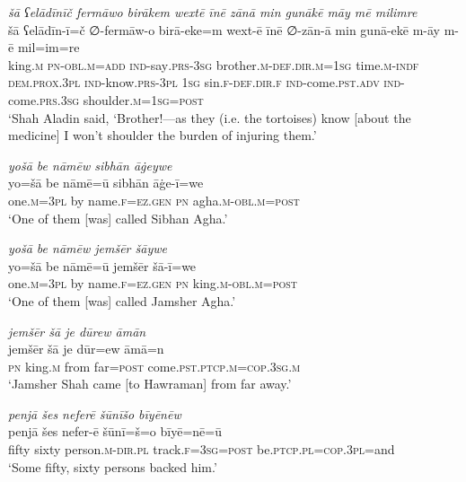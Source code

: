 \ea \label{DG.67}
\textit{šā ʕelādīnīč fermāwo birākem wextē īnē zānā min gunākē māy mē milimre} \\ 
\gll šā ʕelādīn-ī=č ∅-fermāw-o birā-eke=m wext-ē īnē ∅-zān-ā min gunā-ekē m-āy m-ē mil=im=re \\ 
 king\textsc{.m} \textsc{pn}\textsc{-obl}\textsc{.m}\textsc{=add} \textsc{ind-}say\textsc{.prs}\textsc{-3sg} brother\textsc{.m}\textsc{-def}\textsc{.dir}\textsc{.m}\textsc{=1sg} time\textsc{.m}\textsc{-indf} \textsc{dem.prox}\textsc{.3pl} \textsc{ind-}know\textsc{.prs}\textsc{-3pl} \textsc{1sg} sin\textsc{\textsc{.f}}\textsc{-def}\textsc{.dir}\textsc{\textsc{.f}} \textsc{ind-}come\textsc{.pst}\textsc{.adv} \textsc{ind-}come\textsc{.prs}\textsc{.3sg} shoulder\textsc{.m}\textsc{=1sg}\textsc{=\textsc{post}} \\ 
\glt `Shah Aladin said, ‘Brother!—as they (i.e. the tortoises) know [about the medicine] I won’t shoulder the burden of injuring them.'
\z 
 
\ea \label{DP.2}
\textit{yošā be nāmēw sibhān āġeywe} \\ 
\gll yo=šā be nāmē=ū sibhān āġe-ī=we \\ 
 one\textsc{.m}\textsc{=3pl} by name\textsc{\textsc{.f}}\textsc{=ez}\textsc{.gen} \textsc{pn} agha\textsc{.m}\textsc{-obl}\textsc{.m}\textsc{=\textsc{post}} \\ 
\glt `One of them [was] called Sibhan Agha.'
\z 
 
\ea \label{DP.3}
\textit{yošā be nāmēw jemšēr šāywe} \\ 
\gll yo=šā be nāmē=ū jemšēr šā-ī=we \\ 
 one\textsc{.m}\textsc{=3pl} by name\textsc{\textsc{.f}}\textsc{=ez}\textsc{.gen} \textsc{pn} king\textsc{.m}\textsc{-obl}\textsc{.m}\textsc{=\textsc{post}} \\ 
\glt `One of them [was] called Jamsher Agha.'
\z 
 
\ea \label{DP.4}
\textit{jemšēr šā je dūrew āmān} \\ 
\gll jemšēr šā je dūr=ew āmā=n \\ 
 \textsc{pn} king\textsc{.m} from far\textsc{=\textsc{post}} come\textsc{.pst}\textsc{.ptcp}\textsc{.m}\textsc{=cop}\textsc{.3sg}\textsc{.m} \\ 
\glt `Jamsher Shah came [to Hawraman] from far away.'
\z 
 
\ea \label{DP.8}
\textit{penjā šes neferē šūnīšo bīyēnēw} \\ 
\gll penjā šes nefer-ē šūnī=š=o bīyē=nē=ū \\ 
 fifty sixty person\textsc{.m}\textsc{-dir}\textsc{.pl} track\textsc{\textsc{.f}}\textsc{=3sg}\textsc{=\textsc{post}} be\textsc{.ptcp}\textsc{.pl}\textsc{=cop}\textsc{.3pl}=and \\ 
\glt `Some fifty, sixty persons backed him.'
\z 
 
